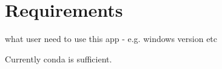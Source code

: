 \section{Requirements}

what user need to use this app - e.g. windows version etc

Currently conda is sufficient.
